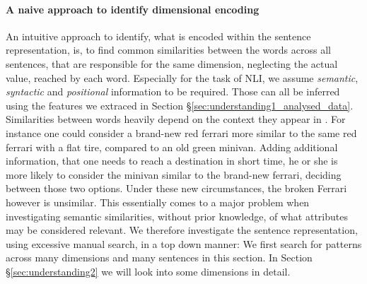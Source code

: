 \paragraph*{A naive approach to identify dimensional encoding}
An intuitive approach to identify, what is encoded within the sentence representation, is, to find common similarities between the words across all sentences, that are responsible for the same dimension, neglecting the actual value, reached by each word. Especially for the task of \ac{NLI}, we assume \textit{semantic}, \textit{syntactic} and \textit{positional} information to be required. Those can all be inferred using the features we extraced in Section §\ref{sec:understanding1_analysed_data}. Similarities between words heavily depend on the context they appear in \citep{dagan2000contextual}. For instance one could consider a brand-new red ferrari more similar to the same red ferrari with a flat tire, compared to an old green minivan. Adding additional information, that one needs to reach a destination in short time, he or she is more likely to consider the minivan similar to the brand-new ferrari, deciding between those two options. Under these new circumstances, the broken Ferrari however is unsimilar. This essentially comes to a major problem when investigating semantic similarities, without prior knowledge, of what attributes may be considered relevant. We therefore investigate the sentence representation, using excessive manual search, in a top down manner: We first search for patterns across many dimensions and many sentences in this section. In Section §\ref{sec:understanding2} we will look into some dimensions in detail.

